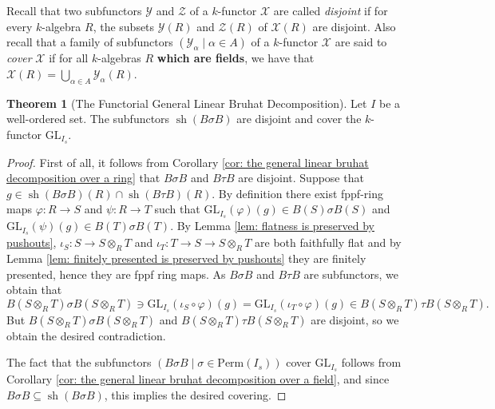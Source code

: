 \documentclass[oneside,11pt]{amsart}
\newcommand{\mX}{\ensuremath{\mathcal{X}}}
\newcommand{\mY}{\ensuremath{\mathcal{Y}}}
\newcommand{\mZ}{\ensuremath{\mathcal{Z}}}
\newcommand{\GL}{\ensuremath{\text{GL}}}
\newcommand{\Perm}{\ensuremath{\text{Perm}}}
\newcommand{\sh}{\operatorname{sh}}
\theoremstyle{definition}
\newtheorem{proof techniques}{Proof Techniques}
\newtheorem{theorem}{Theorem}
\begin{document}
Recall that two subfunctors $\mY$ and $\mZ$ of a $k$-functor $\mX$ are called \emph{disjoint} if for every $k$-algebra $R$, the subsets $\mY(R)$ and $\mZ(R)$ of $\mX(R)$ are disjoint. Also recall that a family of subfunctors $(\mY_\alpha \mid \alpha \in A)$ of a $k$-functor $\mX$ are said to \emph{cover} $\mX$ if for all $k$-algebras $R$ \textbf{which are fields}, we have that $\mX(R) = \bigcup_{\alpha \in A} \mY_\alpha(R)$. 

\begin{theorem}[The Functorial General Linear Bruhat Decomposition]\label{thm: the functorial general linear bruhat decomposition}
Let $I$ be a well-ordered set. The subfunctors $\sh(B \sigma B)$ are disjoint and cover the $k$-functor $\GL_{I_s}$. 
\end{theorem}

\begin{proof}
First of all, it follows from Corollary \ref{cor: the general linear bruhat decomposition over a ring} that $B \sigma B$ and $B \tau B$ are disjoint. Suppose that $g \in \sh(B\sigma B)(R) \cap \sh(B \tau B)(R)$. By definition there exist fppf-ring maps $\varphi : R \to S$ and $\psi: R \to T$ such that $\GL_{I_s}(\varphi)(g) \in B(S) \sigma B(S)$ and $\GL_{I_s}(\psi)(g) \in B(T) \sigma B(T)$. By Lemma \ref{lem: flatness is preserved by pushouts}, $\iota_S:  S \to S \otimes_R T$ and $\iota_T : T \to S \to S \otimes_R T$ are both faithfully flat and by Lemma \ref{lem: finitely presented is preserved by pushouts} they are finitely presented, hence they are fppf ring maps. As $B \sigma B$ and $B \tau B$ are subfunctors, we obtain that 
\begin{equation*}
B(S \otimes_R T) \sigma B(S \otimes_R T) \ni \GL_{I_s}(\iota_S \circ \varphi)(g)  =  \GL_{I_s}(\iota_T \circ \varphi)(g) \in B(S \otimes_R T) \tau B(S \otimes_R T). 
\end{equation*}
But $B(S \otimes_R T) \sigma B(S \otimes_R T)$ and $B(S \otimes_R T) \tau B(S \otimes_R T)$ are disjoint, so we obtain the desired contradiction. 

The fact that the subfunctors $( B \sigma B \mid \sigma \in \Perm(I_s) )$ cover $\GL_{I_s}$ follows from Corollary \ref{cor: the general linear bruhat decomposition over a field}, and since $B \sigma B \subseteq \sh(B \sigma B)$, this implies the desired covering. 
\end{proof}
\end{document}

